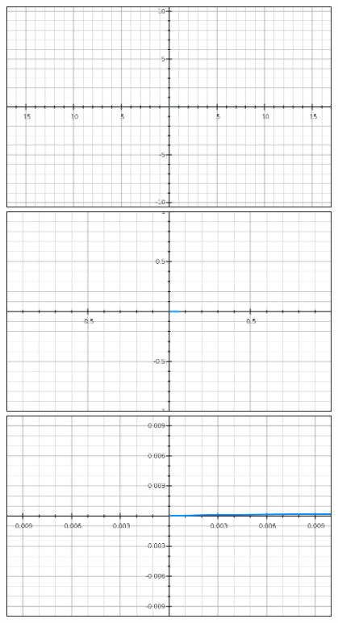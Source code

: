 \documentclass{beamer}
\begin{document}
\begin{frame}
\begin{columns}
\begin{column}{0.5\textwidth}
			\end{column}
			\begin{column}{0.5\textwidth}
				\begin{figure}
					\begin{overprint}
						\includegraphics[width=\textwidth]{pres_img/f1.png}
						\onslide<3>\includegraphics[width=\textwidth]{pres_img/f2.png}
						\onslide<4>\includegraphics[width=\textwidth]{pres_img/f3.png}

\end{overprint}
\end{figure}
\end{column}
\end{columns}
\end{frame}
\end{document}
